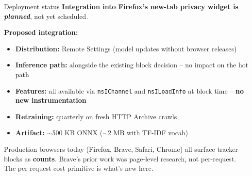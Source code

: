 \documentclass[10pt,aspectratio=169]{beamer}
\begin{document}
\begin{frame}{Deployment status}
    \textbf{Integration into Firefox's new-tab privacy widget is \textit{planned}}, not yet scheduled.

    \vspace{0.8em}
    \textbf{Proposed integration:}
    \begin{itemize}
        \item \textbf{Distribution:} Remote Settings (model updates without browser releases)
        \item \textbf{Inference path:} alongside the existing block decision -- no impact on the hot path
        \item \textbf{Features:} all available via \texttt{nsIChannel} and \texttt{nsILoadInfo} at block time -- \textbf{no new instrumentation}
        \item \textbf{Retraining:} quarterly on fresh HTTP Archive crawls
        \item \textbf{Artifact:} $\sim$500 KB ONNX ($\sim$2 MB with TF-IDF vocab)
    \end{itemize}

    \vspace{0.5em}
    \small
    Production browsers today (Firefox, Brave, Safari, Chrome) all surface tracker blocks as \textbf{counts}. Brave's prior work was page-level research, not per-request. The per-request cost primitive is what's new here.
\end{frame}
\end{document}
